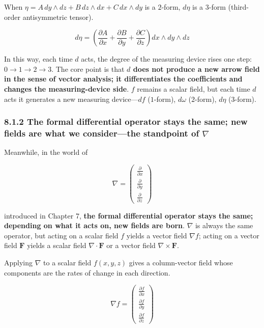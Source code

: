 When \(\eta = A\,dy\wedge dz + B\,dz\wedge dx + C\,dx\wedge dy\) is a
\(2\)-form, \(d\eta\) is a \(3\)-form (third-order antisymmetric
tensor).

\[d\eta = \left(\frac{\partial A}{\partial x} + \frac{\partial B}{\partial y} + \frac{\partial C}{\partial z}\right) dx\wedge dy\wedge dz\]

In this way, each time \(d\) acts, the degree of the measuring device
rises one step: \(0\to1\to2\to3\). The core point is that
\textbf{$d$ does not produce a new arrow field in the sense of vector analysis; it differentiates the coefficients and changes the measuring-device side}.
\(f\) remains a scalar field, but each time \(d\) acts it generates a
new measuring device---\(df\) (\(1\)-form), \(d\omega\) (\(2\)-form),
\(d\eta\) (\(3\)-form).

\hypertarget{the-formal-differential-operator-stays-the-same-new-fields-are-what-we-considerthe-standpoint-of-nabla}{%
\subsubsection{\texorpdfstring{8.1.2 The formal differential operator
stays the same; new fields are what we consider---the standpoint of
\(\nabla\)}{8.1.2 The formal differential operator stays the same; new fields are what we consider---the standpoint of \textbackslash nabla}}\label{the-formal-differential-operator-stays-the-same-new-fields-are-what-we-considerthe-standpoint-of-nabla}}

Meanwhile, in the world of

\[
\nabla
=
\begin{pmatrix}
\frac{\partial}{\partial x}\\[0.3em]
\frac{\partial}{\partial y}\\[0.3em]
\frac{\partial}{\partial z}
\end{pmatrix}
\]

introduced in Chapter 7,
\textbf{the formal differential operator stays the same; depending on what it acts on, new fields are born}.
\(\nabla\) is always the same operator, but acting on a scalar field
\(f\) yields a vector field \(\nabla f\); acting on a vector field
\(\mathbf{F}\) yields a scalar field \(\nabla\cdot\mathbf{F}\) or a
vector field \(\nabla\times\mathbf{F}\).

Applying \(\nabla\) to a scalar field \(f(x,y,z)\) gives a column-vector
field whose components are the rates of change in each direction.

\[\nabla f = \begin{pmatrix} \frac{\partial f}{\partial x} \\[0.3em] \frac{\partial f}{\partial y} \\[0.3em] \frac{\partial f}{\partial z} \end{pmatrix}\]

